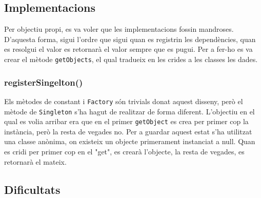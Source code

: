 \subsection{Implementacions}
Per objectiu propi, es va voler que les implementacions fossin mandroses. D'aquesta forma, sigui l'ordre que sigui quan
es registrin les dependències, quan es resolgui el valor es retornarà el valor sempre que es pugui. Per a fer-ho es va
crear el mètode \texttt{getObjects}, el qual tradueix en les crides a les classes les dades.
\subsubsection{registerSingelton()}
Els mètodes de constant i \texttt{Factory} són trivials donat aquest disseny, però el mètode de \texttt{Singleton} s'ha
hagut de realitzar de forma diferent. L'objectiu en el qual es volia arribar era que en el primer \texttt{getObject} es
crea per primer cop la instància, però la resta de vegades no. Per a guardar aquest estat s'ha utilitzat una classe anònima,
on existeix un objecte primerament instanciat a null. Quan es cridi per primer cop en el "get", es crearà l'objecte, la resta
de vegades, es retornarà el mateix.
\subsection{Dificultats}

